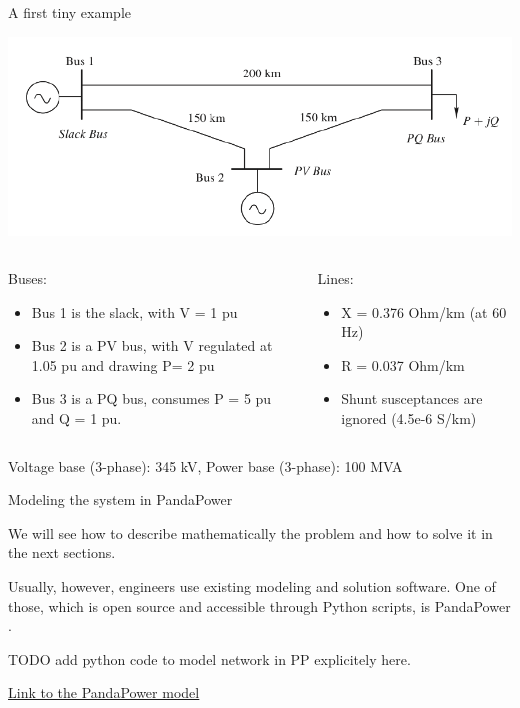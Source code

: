 \begin{frame}[allowframebreaks]{A first tiny example}
    \begin{center}
        \includegraphics[width=0.8\linewidth]{images/PF_net_1.png}
    \end{center}
    \begin{columns}
        \begin{column}{0.5\linewidth}
            Buses:
            \begin{itemize}
                \item Bus 1 is the slack, with V = 1 pu
                \item Bus 2 is a PV bus, with V regulated at 1.05 pu and drawing P= 2 pu
                \item Bus 3 is a PQ bus, consumes P = 5 pu and Q = 1 pu.
            \end{itemize}
        \end{column}
        \begin{column}{0.5\linewidth}
            Lines:
            \begin{itemize}
                \item X = 0.376 Ohm/km (at 60 Hz)
                \item R = 0.037 Ohm/km
                \item Shunt susceptances are ignored (4.5e-6 S/km)
            \end{itemize}
        \end{column}
    \end{columns}
    Voltage base (3-phase): 345 kV,
    Power base (3-phase): 100 MVA
\end{frame}


\begin{frame}{Modeling the system in PandaPower}

    We will see how to describe mathematically the problem and how to solve it in the next sections.

    Usually, however, engineers use existing modeling and solution software.
    One of those, which is open source and accessible through Python scripts, is PandaPower \cite{thurner2018pandapower}. 

    \alert{TODO add python code to model network in PP explicitely here.}

    \href{https://colab.research.google.com/drive/103VIzly2huoS-PjnYdbCaeBS1dunJS7H?usp=sharing}{\underline{Link to the PandaPower model}} 
    
\end{frame}

